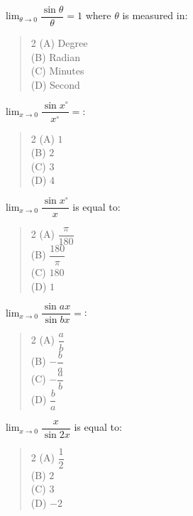 \documentclass[11pt,a4paper]{article}
\begin{document}
\begin{mcqlist}
\item $\displaystyle\lim_{\theta\to0}\dfrac{\sin\theta}{\theta}=1$ where $\theta$ is measured in:
\begin{quote}\begin{multicols}{2}
\noindent (A) Degree \\
(B) Radian \\
(C) Minutes \\
(D) Second
\end{multicols}\end{quote}

\item $\displaystyle\lim_{x\to0}\dfrac{\sin x^{\circ}}{x^{\circ}} = $:
\begin{quote}\begin{multicols}{2}
\noindent (A) $1$ \\
(B) $2$ \\
(C) $3$ \\
(D) $4$
\end{multicols}\end{quote}

\item $\displaystyle\lim_{x\to0}\dfrac{\sin x^{\circ}}{x}$ is equal to:
\begin{quote}\begin{multicols}{2}
\noindent (A) $\dfrac{\pi}{180}$ \\
(B) $\dfrac{180}{\pi}$ \\
(C) $180$ \\
(D) $1$
\end{multicols}\end{quote}

\item $\displaystyle\lim_{x\to0}\dfrac{\sin ax}{\sin bx} = $:
\begin{quote}\begin{multicols}{2}
\noindent (A) $\dfrac{a}{b}$ \\
(B) $-\dfrac{b}{a}$ \\
(C) $-\dfrac{a}{b}$ \\
(D) $\dfrac{b}{a}$
\end{multicols}\end{quote}

\item $\displaystyle\lim_{x\to0}\dfrac{x}{\sin2x}$ is equal to:
\begin{quote}\begin{multicols}{2}
\noindent (A) $\dfrac{1}{2}$ \\
(B) $2$ \\
(C) $3$ \\
(D) $-2$
\end{multicols}\end{quote}


\end{mcqlist}
\end{document}
